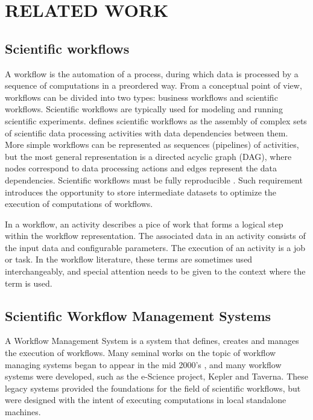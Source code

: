 \chapter{RELATED WORK}
\label{chap:related}
\section{Scientific workflows}
A workflow is the automation of a process, during which data is processed by a sequence of computations in a preordered way.  From a conceptual point of view, workflows can be divided into two types: business workflows and scientific workflows. Scientific workflows are typically used for modeling and running scientific experiments. \cite{taylor2014workflows} defines scientific workflows as the assembly of complex sets of scientific data processing activities with data dependencies between them. More simple workflows can be represented as sequences (pipelines) of activities, but the most general representation is a directed acyclic graph (DAG), where nodes correspond to data processing actions and edges represent the data dependencies.  Scientific workflows must be fully reproducible \citep{barker2007scientific}. Such requirement introduces the opportunity to store intermediate datasets to optimize the execution of computations of workflows.

In a workflow, an activity describes a pice of work that forms a logical step within the workflow representation.  The associated data in an activity consists of the input data and configurable parameters.  The execution of an activity is a job or task. In the workflow literature, these terms are sometimes used interchangeably, and special attention needs to be given to the context where the term is used.
 
\section{Scientific Workflow Management Systems}
A Workflow Management System is a system that defines, creates and manages the execution of workflows. Many seminal works on the topic of workflow managing systems began to appear in the mid 2000's \citep[e.g.]{yu2005taxonomy, fox2006special, gil2007examining}, and many workflow systems were developed, such as the e-Science project\citep{deelman2009workflows}, Kepler\citep{altintas2004kepler} and Taverna\citep{oinn2006taverna}. These legacy systems provided the foundations for the field of scientific workflows, but were designed with the intent of executing computations in local standalone machines.

